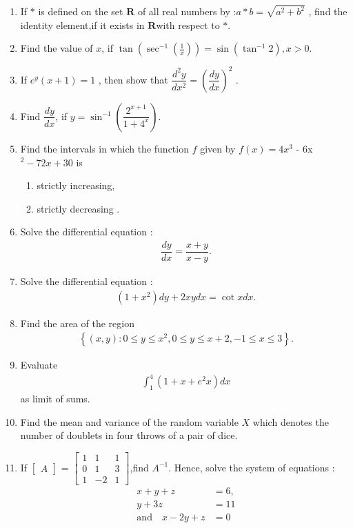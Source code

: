 \documentclass[12pt,-letter paper]{article}
\providecommand{\myvec}[1]{\ensuremath{\begin{bmatrix}#1\end{bmatrix}}}
\providecommand{\cbrak}[1]{\ensuremath{\left\{#1\right\}}}
\providecommand{\brak}[1]{\ensuremath{\left(#1\right)}}
\begin{document}
\begin{enumerate}
\item If $*$ is defined on the set $\textbf{R}$ of all real numbers by :$ a * b =\sqrt{a^{2}+b^{2}}$ ,
find the identity element,if it exists in $\textbf{R}$with respect to $*$.

\item Find the value of $x$, if $\tan \brak{\sec^{-1}\brak{\frac{1}{x}}} = \sin \brak{\tan^{-1}{2}},x > 0$.

\item If $e^{y}\brak{x+1}=1$ , then show that $\dfrac{d^{2}y}{dx^{2}} =\brak{ \dfrac{dy}{dx}}^{2}$ .

\item Find $\dfrac{dy}{dx}$, if $y = \sin ^{-1}\brak{\dfrac{2^{x+1}}{1+4^{x}}}$.

\item Find the intervals in which the function $f$ given by $f(x) = 4x^{3}$ - 6x$^{2}-72x+ 30$ is
\begin{enumerate}
    \item  strictly increasing,
     \item strictly decreasing .
\end{enumerate}

\item Solve the differential equation :
\begin{align*}
    \dfrac{dy}{dx} = \dfrac{x+y}{x-y}.
\end{align*}

\item Solve the differential equation :
\begin{align*}
    \brak{1+x^{2}}dy + 2xy dx =\cot x dx.
\end{align*}

\item Find the area of the region 
\begin{align*}
    \cbrak{(x,y):0\leq y \leq x^{2},0 \leq y \leq x +2 , -1 \leq x \leq 3}.
\end{align*}

\item Evaluate 
\begin{align*}
    \int_{1}^{4}\brak{1+x+e^2x}dx 
\end{align*}
as limit of sums.

\item Find the mean and variance of the random variable $X$ which denotes the number of doublets in four throws of a pair of dice.

\item If \myvec {A} = \myvec{1&1&1\\0&1&3\\1&-2&1},find $A^{-1}$.
Hence, solve the system of equations :
\begin{align*}
    x+y+z&=6,\\
    y+3z&=11\\
    \text  {and} \hspace{12pt}x-2y+z&= 0
\end{align*}

\end {enumerate}
\end{document}
